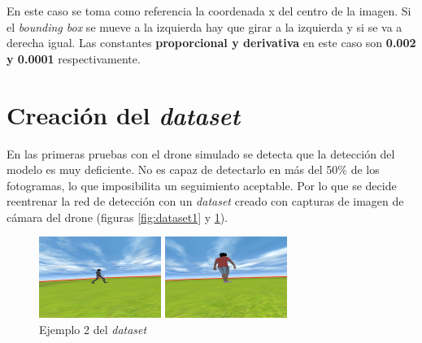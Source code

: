 En este caso se toma como referencia la coordenada x del centro de la imagen. Si el \textit{bounding box} se mueve a la izquierda hay que girar a la izquierda y si se va a derecha igual. Las constantes \textbf{proporcional y derivativa} en este caso son \textbf{0.002 y 0.0001} respectivamente.

\section{Creación del \textit{dataset}}
En las primeras pruebas con el drone simulado se detecta que la detección del modelo es muy deficiente. No es capaz de detectarlo en más del 50\% de los fotogramas, lo que imposibilita un seguimiento aceptable. Por lo que se decide reentrenar la red de detección con un \textit{dataset} creado con capturas de imagen de cámara del drone\cite{github_dataset} (figuras \ref{fig:dataset1} y \ref{fig:dataset2}).
\begin{figure}[!htb]
    \includegraphics[width=\linewidth]{figures/simulado/person157.jpg}
    \caption{Ejemplo 1 del \textit{dataset}}\label{fig:dataset1}
\endminipage\hfill
{}
    \includegraphics[width=\linewidth]{figures/simulado/person227.jpg}
    \caption{Ejemplo 2 del \textit{dataset}}\label{fig:dataset2}
\endminipage\hfill
\end{figure}

